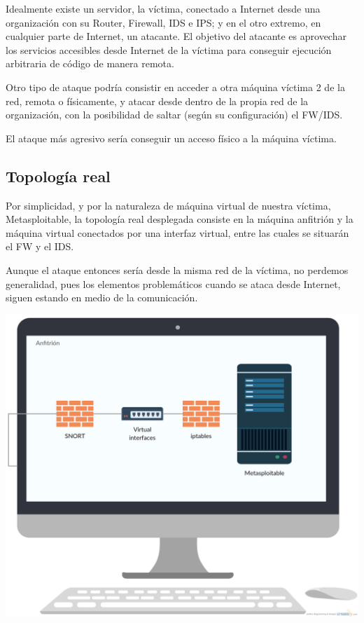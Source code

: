 \documentclass[a4paper,12pt]{scrartcl}
\begin{document}
Idealmente existe un servidor, la víctima, conectado a Internet desde una organización con su Router, Firewall, IDS e IPS; y en el otro extremo, en cualquier parte de Internet, un atacante. El objetivo del atacante es aprovechar los servicios accesibles desde Internet de la víctima para conseguir ejecución arbitraria de código de manera remota.

Otro tipo de ataque podría consistir en acceder a otra máquina víctima 2 de la red, remota o físicamente, y atacar desde dentro de la propia red de la organización, con la posibilidad de saltar (según su configuración) el FW/IDS.

El ataque más agresivo sería conseguir un acceso físico a la máquina víctima.

\subsection{Topología real}


Por simplicidad, y por la naturaleza de máquina virtual de nuestra víctima, Metasploitable, la topología real desplegada consiste en la máquina anfitrión y la máquina virtual conectados por una interfaz virtual, entre las cuales se situarán el FW y el IDS.

Aunque el ataque entonces sería desde la misma red de la víctima, no perdemos generalidad, pues los elementos problemáticos cuando se ataca desde Internet, siguen estando en medio de la comunicación.

\includegraphics[width=1\linewidth]{toporeal.png}
\end{document}
